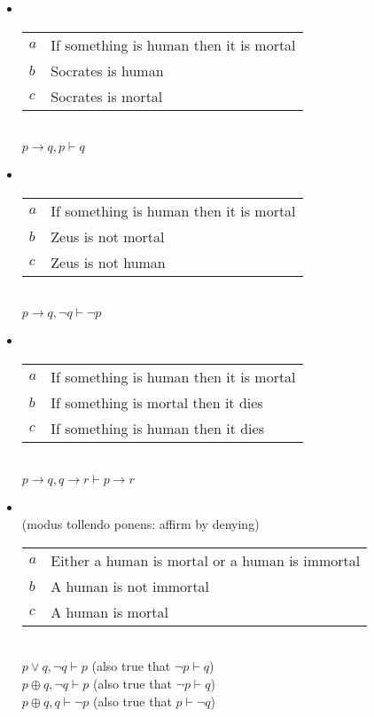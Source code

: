 \documentclass[headrule,footrule]{foils}
\begin{document}
\begin{itemize}
\item {}
\\[2ex]
  \begin{tabular}{ll}
    $a$ & If something is human then it is mortal \\
    $b$ & Socrates is human \\ \hline
    $c$ & Socrates is mortal
  \end{tabular}
\\ $p \rightarrow q, p \vdash q$
\item {}
\\[2ex]
  \begin{tabular}{ll}
    $a$ & If something is human then it is mortal \\
    $b$ & Zeus is not mortal \\ \hline
    $c$ & Zeus is not human
  \end{tabular}
\\ $p \rightarrow q, \neg q \vdash \neg p$

\newpage
\item {}
\\[2ex]
 \begin{tabular}{ll}
    $a$ & If something is human then it is mortal \\
    $b$ & If something is mortal then it dies \\ \hline
    $c$ & If something is human then it dies
  \end{tabular}
\\ $p \rightarrow q, q \rightarrow r \vdash p \rightarrow r$
\item {}
\\ (modus tollendo ponens: affirm by denying)
\\[2ex]
 \begin{tabular}{ll}
    $a$ & Either a human is mortal or a human is immortal \\
    $b$ & A human is not immortal \\ \hline
    $c$ & A human is mortal
  \end{tabular}
\\ $p \vee q, \neg q \vdash p$  (also true that $\neg p \vdash q$)
\\ $p \oplus q, \neg q \vdash p$  (also true that $\neg p \vdash q$)
\\ $p \oplus q, q \vdash \neg p$  (also true that $p \vdash \neg q$)
\end{itemize}
\end{document}
